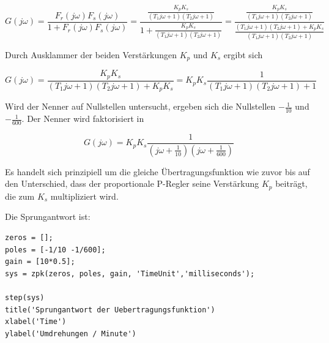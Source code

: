 \documentclass[            %
draft = false,             		%
paper = A4,                		%
pagesize = pdftex,         		%
fontsize = 10pt,           		%
DIV=15,                    		%
twoside = false,           		%
twocolumn = false,         		%
parskip = full,           		%
chapterprefix = false,      		%
appendixprefix = true,     		%
headinclude = false,       		%
footinclude = false,       		%
mpinclude = false,         		%
numbers = auto,            		%
cleardoublepage = plain,   		%
footnotes = multiple,      		%
titlepage = true,          		%
headings = normal,         		%
open = right,              		%
bibliography = openstyle,  		%
listof = chaptergapline,   		%
overfullrule = true,
]{scrbook}
\begin{document}
\begin{equation}
G(j\omega) = \frac{F_r(j\omega)F_s(j\omega)}{1 + F_r(j\omega)F_s(j\omega)} = \frac{\frac{K_{p}K_{s}}{(T_{1}j\omega + 1)(T_{2}j\omega + 1)}}{1 + \frac{K_{p}K_{s}}{(T_{1}j\omega + 1)(T_{2}j\omega + 1)}}
= \frac{\frac{K_{p}K_{s}}{(T_{1}j\omega + 1)(T_{2}j\omega + 1)}}{\frac{(T_{1}j\omega + 1)(T_{2}j\omega + 1) + K_{p}K_{s}}{(T_{1}j\omega + 1)(T_{2}j\omega + 1)}}
\end{equation}

Durch Ausklammer der beiden Verstärkungen $K_{p}$ und $K_{s}$ ergibt sich

\begin{equation}
G(j\omega) = \frac{K_{p}K_{s}}{(T_{1}j\omega + 1)(T_{2}j\omega + 1) + K_{p}K_{s}} = K_{p}K_{s}\frac{1}{(T_{1}j\omega + 1)(T_{2}j\omega + 1) + 1}
\end{equation}

Wird der Nenner auf Nullstellen untersucht, ergeben sich die Nullstellen $-\frac{1}{10}$ und $-\frac{1}{600}$. Der Nenner wird faktorisiert in

\begin{equation}
G(j\omega) = K_{p}K_{s}\frac{1}{(j\omega + \frac{1}{10})(j\omega + \frac{1}{600})}
\end{equation}

Es handelt sich prinzipiell um die gleiche Übertragungsfunktion wie zuvor bis auf den Unterschied, dass der proportionale P-Regler seine Verstärkung $K_{p}$ beiträgt,
die zum $K_{s}$ multipliziert wird.

Die Sprungantwort ist:

\begin{lstlisting}[style=CStyle]
zeros = [];
poles = [-1/10 -1/600];
gain = [10*0.5];
sys = zpk(zeros, poles, gain, 'TimeUnit','milliseconds');

step(sys)
title('Sprungantwort der Uebertragungsfunktion')
xlabel('Time') 
ylabel('Umdrehungen / Minute') 
\end{lstlisting}
\end{document}
